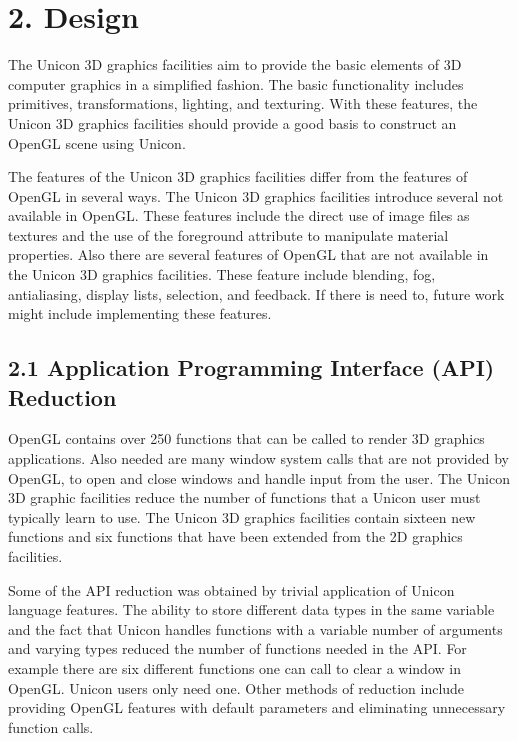 \documentclass[letterpaper]{article}
\begin{document}
\section[2. Design]{2. Design}


The Unicon 3D graphics facilities aim to provide the basic elements of
3D computer graphics in a simplified fashion. The basic functionality
includes primitives, transformations, lighting, and texturing. With
these features, the Unicon 3D graphics facilities should provide a
good basis to construct an OpenGL scene using Unicon.

The features of the Unicon 3D graphics facilities differ from the
features of OpenGL in several ways. The Unicon 3D graphics facilities
introduce several not available in OpenGL. These features include the
direct use of image files as textures and the use of the foreground
attribute to manipulate material properties. Also there are several
features of OpenGL that are not available in the Unicon 3D graphics
facilities. These feature include blending, fog, antialiasing, display
lists, selection, and feedback. If there is need to, future work might
include implementing these features.

\subsection[2.1 Application Programming Interface (API)
Reduction]{\bfseries 2.1 Application Programming Interface (API) Reduction}

OpenGL contains over 250 functions that can be called to render 3D
graphics applications. Also needed are many window system calls that
are not provided by OpenGL, to open and close windows and handle input
from the user. The Unicon 3D graphic facilities reduce the number of
functions that a Unicon user must typically learn to use. The Unicon
3D graphics facilities contain sixteen new functions and six functions
that have been extended from the 2D graphics facilities.

Some of the API reduction was obtained by trivial application of
Unicon language features. The ability to store different data types in
the same variable and the fact that Unicon handles functions with a
variable number of arguments and varying types reduced the number of
functions needed in the API. For example there are six different
functions one can call to clear a window in OpenGL. Unicon users only
need one. Other methods of reduction include providing OpenGL features
with default parameters and eliminating unnecessary function calls.
\end{document}
